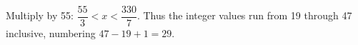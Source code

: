 Multiply by 55: $\dfrac{55}{3}<x<\dfrac{330}{7}$. Thus the integer values run from 19 through 47 inclusive, numbering $47-19+1=\boxed{29}$.
